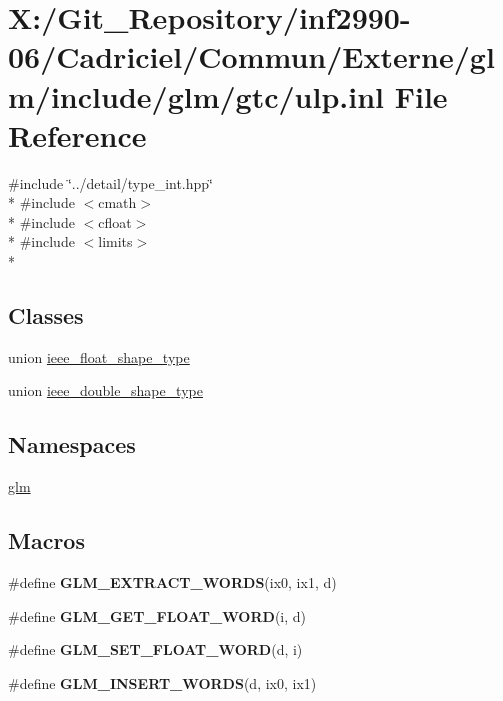\hypertarget{ulp_8inl}{\section{X\-:/\-Git\-\_\-\-Repository/inf2990-\/06/\-Cadriciel/\-Commun/\-Externe/glm/include/glm/gtc/ulp.inl File Reference}
\label{ulp_8inl}
}
{\ttfamily \#include \char`\"{}../detail/type\-\_\-int.\-hpp\char`\"{}}\\*
{\ttfamily \#include $<$cmath$>$}\\*
{\ttfamily \#include $<$cfloat$>$}\\*
{\ttfamily \#include $<$limits$>$}\\*
\subsection*{Classes}
\begin{DoxyCompactItemize}
\item 
union \hyperlink{unionieee__float__shape__type}{ieee\-\_\-float\-\_\-shape\-\_\-type}
\item 
union \hyperlink{unionieee__double__shape__type}{ieee\-\_\-double\-\_\-shape\-\_\-type}
\end{DoxyCompactItemize}
\subsection*{Namespaces}
\begin{DoxyCompactItemize}
\item 
\hyperlink{namespaceglm}{glm}
\end{DoxyCompactItemize}
\subsection*{Macros}
\begin{DoxyCompactItemize}
\item 
\#define {\bfseries G\-L\-M\-\_\-\-E\-X\-T\-R\-A\-C\-T\-\_\-\-W\-O\-R\-D\-S}(ix0, ix1, d)
\item 
\#define {\bfseries G\-L\-M\-\_\-\-G\-E\-T\-\_\-\-F\-L\-O\-A\-T\-\_\-\-W\-O\-R\-D}(i, d)
\item 
\#define {\bfseries G\-L\-M\-\_\-\-S\-E\-T\-\_\-\-F\-L\-O\-A\-T\-\_\-\-W\-O\-R\-D}(d, i)
\item 
\#define {\bfseries G\-L\-M\-\_\-\-I\-N\-S\-E\-R\-T\-\_\-\-W\-O\-R\-D\-S}(d, ix0, ix1)
\end{DoxyCompactItemize}
